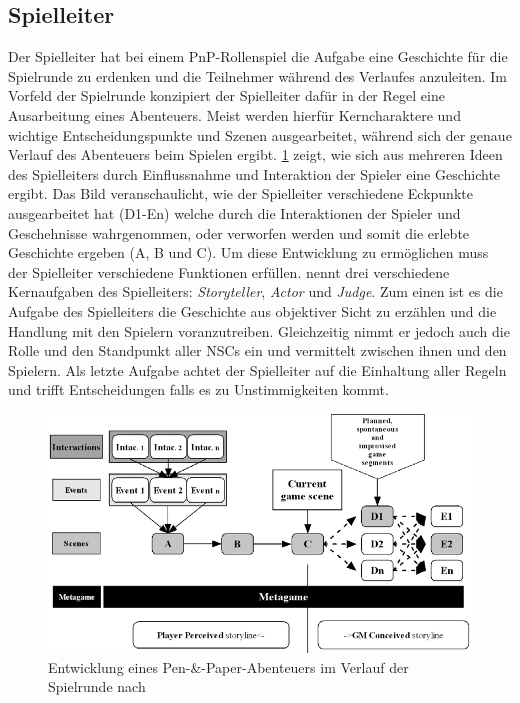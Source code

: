 \subsection{Spielleiter}
\label{sec:Spielleiter}
Der Spielleiter hat bei einem PnP-Rollenspiel die Aufgabe eine Geschichte für die Spielrunde zu erdenken und die Teilnehmer während des Verlaufes anzuleiten. Im Vorfeld der Spielrunde konzipiert der Spielleiter dafür in der Regel eine Ausarbeitung eines Abenteuers. Meist werden hierfür Kerncharaktere und wichtige Entscheidungspunkte und Szenen ausgearbeitet, während sich der genaue Verlauf des Abenteuers beim Spielen ergibt. \ref{fig:storyflow_pnp} zeigt, wie sich aus mehreren Ideen des Spielleiters durch Einflussnahme und Interaktion der Spieler eine Geschichte ergibt. Das Bild veranschaulicht, wie der Spielleiter verschiedene Eckpunkte ausgearbeitet hat (D1-En) welche durch die Interaktionen der Spieler und Geschehnisse wahrgenommen, oder verworfen werden und somit die erlebte Geschichte ergeben (A, B und C). Um diese Entwicklung zu ermöglichen muss der Spielleiter verschiedene Funktionen erfüllen.\newline
\cite{Arinbjarnar} nennt drei verschiedene Kernaufgaben des Spielleiters: \emph{Storyteller}, \emph{Actor} und \emph{Judge}. Zum einen ist es die Aufgabe des Spielleiters die Geschichte aus objektiver Sicht zu erzählen und die Handlung mit den Spielern voranzutreiben. Gleichzeitig nimmt er jedoch auch die Rolle und den Standpunkt aller NSCs ein und vermittelt zwischen ihnen und den Spielern. Als letzte Aufgabe achtet der Spielleiter auf die Einhaltung aller Regeln und trifft Entscheidungen falls es zu Unstimmigkeiten kommt.
\begin{figure}
	\centering
		\includegraphics[width=1.00\textwidth]{media/storyflow_pnp.png}
	\caption{Entwicklung eines Pen-\&-Paper-Abenteuers im Verlauf der Spielrunde nach \cite{Tychsen2006a}}
	\label{fig:storyflow_pnp}
\end{figure}


